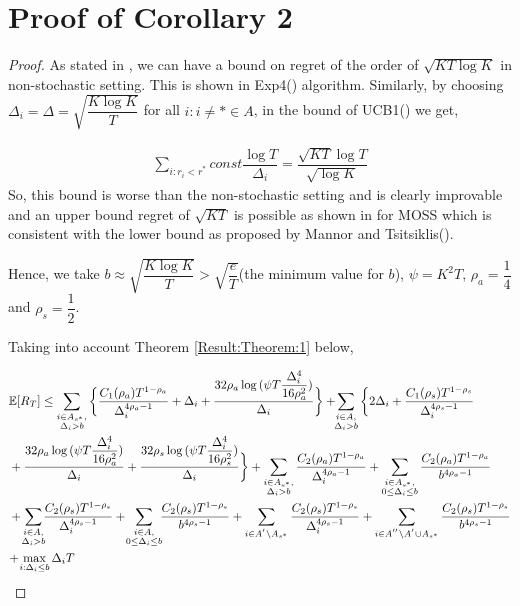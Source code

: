 \section{Proof of Corollary 2}
\label{App:Proof:Corollary:2}
\begin{proof}
As stated in \cite{auer2010ucb}, we can have a bound on regret of the order of $\sqrt{KT\log K}$ in non-stochastic setting. This is shown in Exp4(\cite{auer2002nonstochastic}) algorithm. Similarly, by choosing  $\Delta_{i}=\Delta=\sqrt{\dfrac{K\log K}{T}}$ for all ${i:i\neq *}\in A$, in the bound of UCB1(\cite{auer2002finite}) we get,

\begin{align*}
\sum_{i:r_{i}<r^{*}}const \dfrac{\log T}{\Delta_{i}}=\dfrac{\sqrt{KT}\log T}{\sqrt{\log K}}
\end{align*}
So, this bound is worse than the non-stochastic setting and is clearly improvable and an upper bound regret of $\sqrt{KT}$ is possible as shown in \cite{audibert2009minimax} for MOSS which is consistent with the lower bound as proposed by Mannor and Tsitsiklis(\cite{mannor2004sample}).

	Hence, we take $b\approx\sqrt{\dfrac{K\log K}{T}} > \sqrt{\dfrac{e}{T}}$(the minimum value for $b$), $\psi=K^{2}T$, $\rho_{a}=\dfrac{1}{4}$ and $\rho_{s}=\dfrac{1}{2}$.
	
	Taking into account Theorem \ref{Result:Theorem:1} below, 
	
\begin{align*}
&\E [R_{T}]\leq 
\sum\limits_{\substack{i\in A_{s^{*}},\\\Delta_{i} > b}}\bigg\lbrace \dfrac{C_1(\rho_{a})T^{1-\rho_{a}}}{\Delta_{i}^{4\rho_{a}-1}} + \Delta_{i}
 + \frac{32\rho_{a}\log{(\psi T\dfrac{\Delta_{i}^{4}}{16\rho_{a}^{2}})}}{\Delta_{i}} \bigg\rbrace
 + \! \! \sum\limits_{\substack{i\in A,\\\Delta_{i} > b}} \bigg\lbrace 2\Delta_{i}+
\dfrac{C_1(\rho_{s})T^{1-\rho_{s}}}{\Delta_{i}^{4\rho_{s}-1}} \\
&+ \frac{32\rho_{a}\log{(\psi T\dfrac{\Delta_{i}^{4}}{16\rho_{a}^{2}})}}{\Delta_{i}} 
+ \dfrac{32\rho_{s}\log{(\psi T\dfrac{\Delta_{i}^{4}}{16\rho_{s}^{2}})}}{\Delta_{i}}\bigg\rbrace 
+ \sum\limits_{\substack{i\in A_{s^{*}},\\ \Delta_{i} > b}} 
\frac{C_2(\rho_{a})T^{1-\rho_{a}}}{\Delta_{i}^{4\rho_{a}-1}}
+\sum\limits_{\substack{i\in A_{s^{*}},\\0\leq\Delta_{i}\leq b}}\frac{C_2(\rho_a)T^{1-\rho_{a}}}{b^{4\rho_{a} -1}}\\ 
&+ \!\sum\limits_{\substack{i\in A,\\ \Delta_{i} > b}}\! \! \dfrac{C_2(\rho_{s})T^{1-\rho_{s}}}{\Delta_{i}^{4\rho_{s}-1}}
 + \!\sum\limits_{\substack{i\in A,\\0\leq\Delta_{i}\leq b}}\! \! \dfrac{C_2(\rho_{s})T^{1-\rho_{s}}}{b^{4\rho_{s} -1}}  + \sum_{i\in A^{'}\setminus A_{s^*}}\dfrac{C_{2}(\rho_{s})T^{1-\rho_{s}}}{\Delta_{i}^{4\rho_{s}-1}} +\sum_{i\in A^{''}\setminus A^{'} \cup A_{s^*}}\dfrac{C_{2}(\rho_{s})T^{1-\rho_{s}}}{b^{4\rho_{s}-1}}\\
& \!+\! \max\limits_{i:\Delta_{i}\leq b}\Delta_{i}T
\end{align*}


\end{proof}
